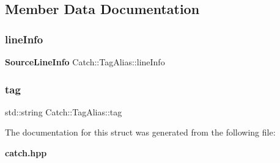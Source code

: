 \subsection{Member Data Documentation}
\mbox{\label{struct_catch_1_1_tag_alias_a2f51fe0b3c052561275d26b6eb88f702}} 
\subsubsection{line\+Info}
{\footnotesize\ttfamily \textbf{ Source\+Line\+Info} Catch\+::\+Tag\+Alias\+::line\+Info}

\mbox{\label{struct_catch_1_1_tag_alias_a950183883ab17c90d0fab16b966b6e2d}} 
\subsubsection{tag}
{\footnotesize\ttfamily std\+::string Catch\+::\+Tag\+Alias\+::tag}



The documentation for this struct was generated from the following file\+:\begin{DoxyCompactItemize}
\item 
\textbf{ catch.\+hpp}\end{DoxyCompactItemize}
